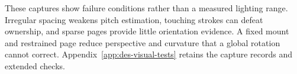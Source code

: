 These captures show failure conditions rather than a measured lighting range. Irregular spacing weakens pitch estimation, touching strokes can defeat ownership, and sparse pages provide little orientation evidence. A fixed mount and restrained page reduce perspective and curvature that a global rotation cannot correct. Appendix~\ref{app:des-visual-tests} retains the capture records and extended checks.
\FloatBarrier
